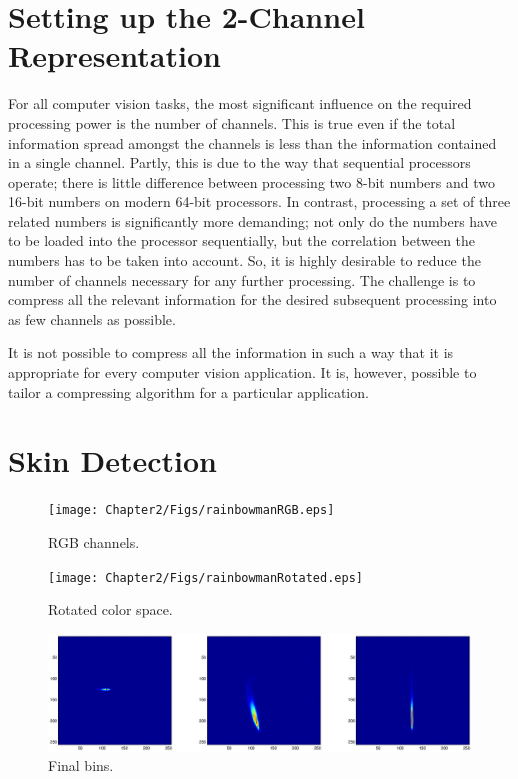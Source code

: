 \section{Setting up the 2-Channel Representation}\label{sec:SettingUp2-ChannelRepresentation}

For all computer vision tasks, the most significant influence on the required processing power is the number of channels. This is true even if the total information spread amongst the channels is less than the information contained in a single channel. Partly, this is due to the way that sequential processors operate; there is little difference between processing two 8-bit numbers and two 16-bit numbers on modern 64-bit processors. In contrast, processing a set of three related numbers is significantly more demanding; not only do the numbers have to be loaded into the processor sequentially, but the correlation between the numbers has to be taken into account. So, it is highly desirable to reduce the number of channels necessary for any further processing. The challenge is to compress all the relevant information for the desired subsequent processing into as few channels as possible.

It is not possible to compress all the information in such a way that it is appropriate for every computer vision application. It is, however, possible to tailor a compressing algorithm for a particular application.


\section{Skin Detection}\label{sec:SkinDetection}

\begin{figure}[h!]
  \caption{RGB channels.}
  \centering
    \texttt{[image: Chapter2/Figs/rainbowmanRGB.eps]}
\end{figure}

\begin{figure}[h!]
  \caption{Rotated color space.}
  \centering
    \texttt{[image: Chapter2/Figs/rainbowmanRotated.eps]}
\end{figure}

\begin{figure}[h!]
  \caption{Final bins.}
  \centering
    \includegraphics[width=\textwidth]{Chapter2/Figs/binsFinal2.eps}
\end{figure}

